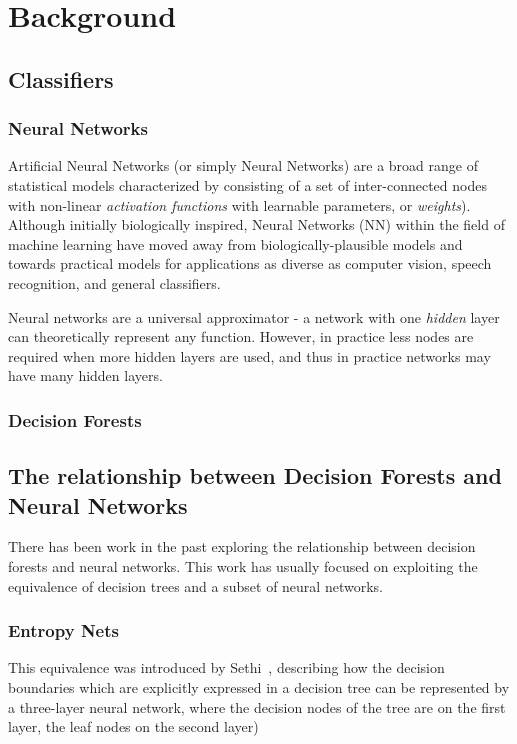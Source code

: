 \documentclass[thesis]{subfiles}
\begin{document}

\chapter{Background}
\label{background}
\ifpdf
    \graphicspath{{Figs/Raster/}{Figs/PDF/}{Figs/}}
\else
    \graphicspath{{Figs/Vector/}{Figs/}}
\fi

\section{Classifiers}
\subsection{Neural Networks}
Artificial Neural Networks (or simply Neural Networks) are a broad range of statistical models characterized by consisting of a set of inter-connected nodes with non-linear \emph{activation functions} with learnable parameters, or \emph{weights}). Although initially biologically inspired, Neural Networks (NN) within the field of machine learning have moved away from biologically-plausible models and towards practical models for applications as diverse as computer vision, speech recognition, and general classifiers.

Neural networks are a universal approximator - a network with one \emph{hidden} layer can theoretically represent any function. However, in practice less nodes are required when more hidden layers are used, and thus in practice networks may have many hidden layers.
\subsection{Decision Forests}

\section{The relationship between Decision Forests and Neural Networks}
There has been work in the past exploring the relationship between decision forests and neural networks. This work has usually focused on exploiting the equivalence of decision trees and a subset of neural networks.

\subsection{Entropy Nets}
This equivalence was introduced by Sethi~\cite{Sethi1990}, describing how the decision boundaries which are explicitly expressed in a decision tree can be represented by a three-layer neural network, where the decision nodes of the tree are on the first layer, the leaf nodes on the second layer)
\end{document}
